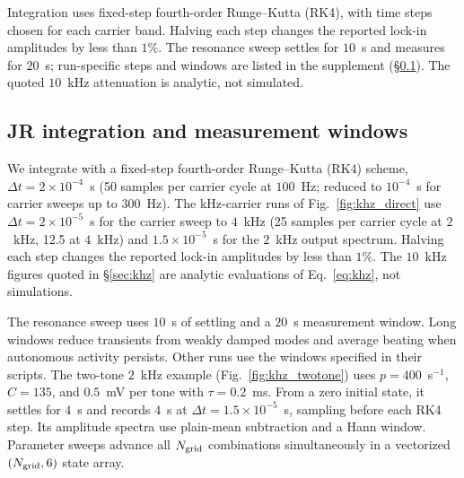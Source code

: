 \documentclass[11pt,a4paper]{article}
\newif\ifjne
\begin{document}
Integration uses fixed-step fourth-order Runge--Kutta (RK4), with time steps
chosen for each carrier band. Halving each step changes the reported lock-in
amplitudes by less than $1\%$. The resonance sweep settles for $10$~s and measures
for $20$~s; run-specific steps and windows are listed in the supplement
(\S\ref{supp:jr-runs}). The quoted $10$~kHz attenuation is analytic, not simulated.
\ifjne\else
\subsection{JR integration and measurement windows}\label{supp:jr-runs}
We integrate with a fixed-step fourth-order Runge--Kutta (RK4) scheme,
$\Delta t=2\times10^{-4}$~s (50 samples per carrier cycle at $100$~Hz; reduced to
$10^{-4}$~s for carrier sweeps up to $300$~Hz). The kHz-carrier runs of
Fig.~\ref{fig:khz_direct} use $\Delta t=2\times10^{-5}$~s for the carrier sweep to
$4$~kHz (25 samples per carrier cycle at $2$~kHz, 12.5 at $4$~kHz) and
$1.5\times10^{-5}$~s for the $2$~kHz output spectrum. Halving each step changes the
reported lock-in amplitudes by less than $1\%$. The $10$~kHz figures quoted in
\S\ref{sec:khz} are analytic evaluations of Eq.~\eqref{eq:khz}, not simulations.

The resonance sweep uses $10$~s of settling and a $20$~s
measurement window. Long windows reduce transients from weakly damped modes and
average beating when autonomous activity persists. Other runs use the windows
specified in their scripts.
The two-tone $2$~kHz example (Fig.~\ref{fig:khz_twotone}) uses $p=400$~s$^{-1}$,
$C=135$, and $0.5$~mV per tone with $\tau=0.2$~ms. From a zero initial state,
it settles for $4$~s and records $4$~s at $\Delta t=1.5\times10^{-5}$~s,
sampling before each RK4 step. Its amplitude spectra use plain-mean subtraction
and a Hann window. Parameter sweeps advance all $N_{\rm grid}$ combinations simultaneously
in a vectorized $(N_{\rm grid},6)$ state array.

\fi
\end{document}
